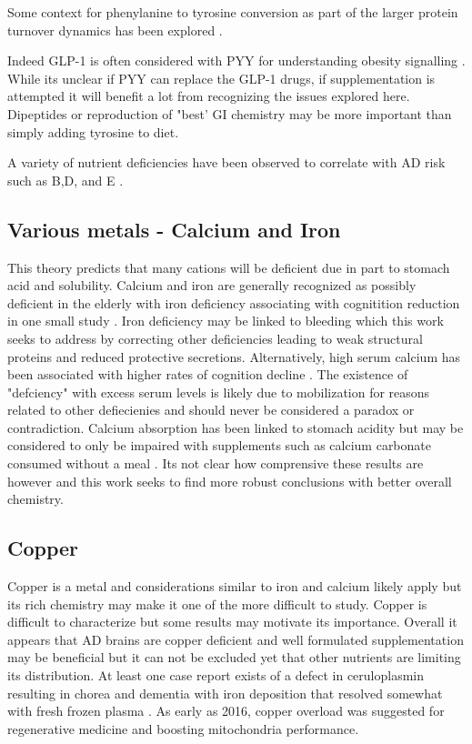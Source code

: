 Some context for phenylanine to tyrosine conversion as
part of the larger protein turnover dynamics has been explored
\cite{Garibotto_Tessari_Verzola_metabolic_conversion_2002}.


Indeed GLP-1 is often considered with PYY for understanding obesity
signalling \cite{PMC3286726}. While its unclear if PYY can replace
the GLP-1 drugs, if supplementation is attempted it will benefit
a lot from recognizing the issues explored here. Dipeptides or
reproduction of "best' GI chemistry may be more important than
simply adding tyrosine to diet.

A variety of nutrient deficiencies have been observed to correlate
with AD risk such as B,D, and E \cite{CONWAY2024177}.

\subsection{Various metals - Calcium and Iron }
This theory predicts that many cations will be deficient
due in part to stomach acid and solubility. 
Calcium and iron are generally recognized as possibly
deficient in the elderly
with iron deficiency associating with cognitition reduction
in one small study 
\cite{YAVUZ2012220}
. 
Iron deficiency may be linked to bleeding
\cite{https://doi.org/10.1111/ggi.13194}
which this work seeks to address by correcting other deficiencies
leading to weak structural proteins and reduced protective
secretions. 
Alternatively, high serum calcium has been associated
with higher rates of cognition decline
\cite{https://doi.org/10.1111/j.1532-5415.2007.01418.x}.
The existence of "defciency" with excess serum levels
is likely due to mobilization for reasons related to
other defiecienies and should never be considered a paradox
or contradiction. 
Calcium absorption has been
linked to stomach acidity but may be considered to only
be impaired with supplements such as calcium carbonate
consumed without a meal \cite{10.1111/j.1753-4887.1992.tb02510.x}.
Its not clear how comprensive these results are however
and this work seeks to find more robust conclusions
with better overall chemistry.


\subsection{Copper}
Copper is a metal and considerations similar to iron and 
calcium likely apply but 
its rich chemistry
may make it one of the more difficult to study.
Copper is difficult to characterize but some results may
motivate its importance. 
Overall it appears that AD brains are copper deficient
and well formulated supplementation may be beneficial
but it can not be excluded yet that other nutrients
are limiting its distribution.
At least one case report exists of a defect in ceruloplasmin
resulting in chorea and dementia with iron deposition that
resolved somewhat with fresh frozen plasma
\cite{Yonekawa_Okabe_Asamoto_Case_Hereditary_1999}.
As early as 2016, copper overload was suggested 
for regenerative medicine and boosting mitochondria
performance\cite{RUIZ201618}.



